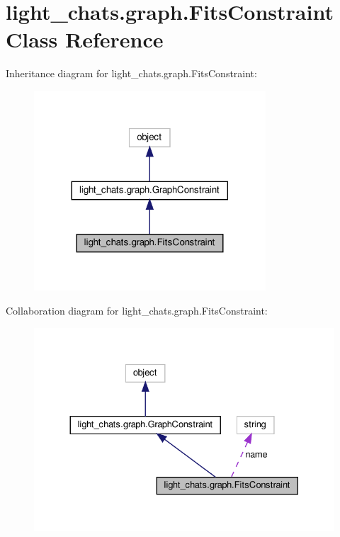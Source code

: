 \hypertarget{classlight__chats_1_1graph_1_1FitsConstraint}{}\section{light\+\_\+chats.\+graph.\+Fits\+Constraint Class Reference}
\label{classlight__chats_1_1graph_1_1FitsConstraint}


Inheritance diagram for light\+\_\+chats.\+graph.\+Fits\+Constraint\+:
\nopagebreak
\begin{figure}[H]
\begin{center}
\leavevmode
\includegraphics[width=245pt]{classlight__chats_1_1graph_1_1FitsConstraint__inherit__graph}
\end{center}
\end{figure}


Collaboration diagram for light\+\_\+chats.\+graph.\+Fits\+Constraint\+:
\nopagebreak
\begin{figure}[H]
\begin{center}
\leavevmode
\includegraphics[width=330pt]{classlight__chats_1_1graph_1_1FitsConstraint__coll__graph}
\end{center}
\end{figure}
